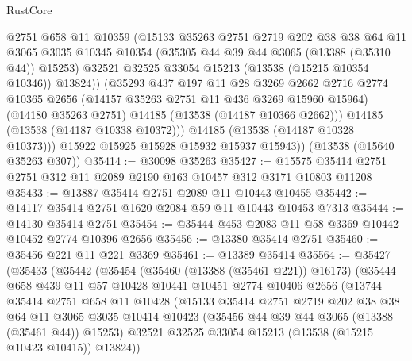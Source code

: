 \begin{lexlean}{RustCore}
\begin{coremodule}
              @2751
              @658
              @11
              @10359
              (@15133
                @35263
                @2751
                @2719
                @202
                @38
                @38
                @64
                @11
                @3065
                @3035
                @10345
                @10354
                (@35305 @44 @39 @44 @3065 (@13388 (@35310 @44)) @15253)
                @32521
                @32525
                @33054
                @15213
                (@13538 (@15215 @10354 @10346))
                @13824))
            (@35293
              @437
              @197
              @11
              @28
              @3269
              @2662
              @2716
              @2774
              @10365
              @2656
              (@14157 @35263 @2751 @11 @436 @3269 @15960 @15964)
              (@14180 @35263 @2751)
              @14185
              (@13538 (@14187 @10366 @2662)))
            @14185
            (@13538 (@14187 @10338 @10372)))
          @14185
          (@13538 (@14187 @10328 @10373)))
        @15922
        @15925
        @15928
        @15932
        @15937
        @15943))
    (@13538 (@15640 @35263 @307))
@35414 := @30098 @35263
@35427 := @15575 @35414 @2751 @2751 @312 @11 @2089 @2190 @163 @10457 @312 @3171 @10803 @11208
@35433 := @13887 @35414 @2751 @2089 @11 @10443 @10455
@35442 := @14117 @35414 @2751 @1620 @2084 @59 @11 @10443 @10453 @7313
@35444 := @14130 @35414 @2751
@35454 := @35444 @453 @2083 @11 @58 @3369 @10442 @10452 @2774 @10396 @2656
@35456 := @13380 @35414 @2751
@35460 := @35456 @221 @11 @221 @3369
@35461 := @13389 @35414
@35564 := @35427
    (@35433
      (@35442
        (@35454
          (@35460 (@13388 (@35461 @221)) @16173)
          (@35444
            @658
            @439
            @11
            @57
            @10428
            @10441
            @10451
            @2774
            @10406
            @2656
            (@13744
              @35414
              @2751
              @658
              @11
              @10428
              (@15133
                @35414
                @2751
                @2719
                @202
                @38
                @38
                @64
                @11
                @3065
                @3035
                @10414
                @10423
                (@35456 @44 @39 @44 @3065 (@13388 (@35461 @44)) @15253)
                @32521
                @32525
                @33054
                @15213
                (@13538 (@15215 @10423 @10415))
                @13824))

\end{coremodule}
\end{lexlean}
